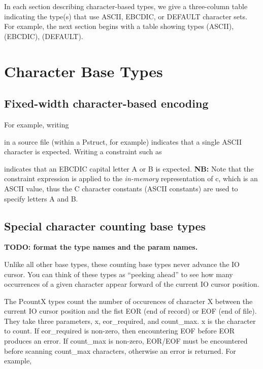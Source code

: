 In each section describing character-based types, we give a
three-column table indicating the type(s) that use ASCII, EBCDIC, or
DEFAULT character sets.  For example, the next section begins with a
table showing types  (ASCII),  (EBCDIC), 
(DEFAULT).

\section{Character Base Types}

\subsection{Fixed-width character-based encoding}

\aedBegin{}
\aedEnd{}
\myvskip{1ex}

\noindent
For example,  writing

%
\noindent
in a \PADSL{} source file (within a Pstruct, for example) indicates
that a single ASCII character is expected.  Writing a constraint
such as 

%
\noindent
indicates that an EBCDIC capital letter A or B is expected.
{\bf NB:}\/ Note that the constraint expression is applied to the
{\em in-memory\/} representation of c, which is an ASCII value,
thus the C character constants (ASCII constants)
are used to specify letters A and B.

\subsection{Special character counting base types}

\aedBegin{}
\aedEnd{}

{\bf TODO: format the type names and the param names.}

Unlike all other base types, these counting base types
never advance the IO cursor.  You can think of these types as
``peeking ahead'' to see how many occurrences of a given character
appear forward of the current IO cursor position.

The PcountX types count the number of occurences of character X
between the current IO cursor position and the fist EOR (end of
record) or EOF (end of file).  They take three parameters, x,
eor\_required, and count\_max.  x is the character to count.  If
eor\_required is non-zero, then encountering EOF before EOR produces
an error.  If count\_max is non-zero, EOR/EOF must be encountered
before scanning count\_max characters, otherwise an error is returned.
For example,

